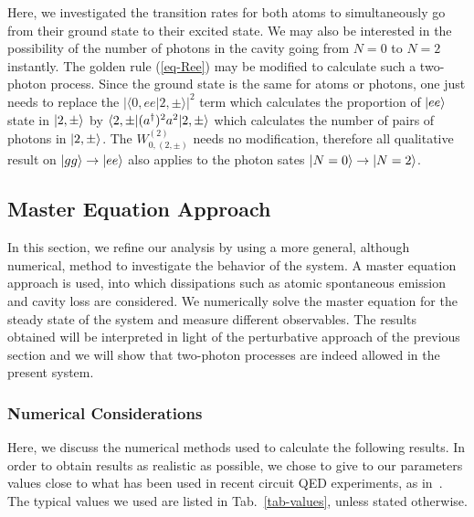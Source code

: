 Here, we investigated the transition rates for both atoms to simultaneously go from their ground state to their excited state. We may also be interested in the possibility of the number of photons in the cavity going from $N=0$ to $N=2$ instantly. The golden rule (\ref{eq-Ree}) may be modified to calculate such a two-photon process. Since the ground state is the same for atoms or photons, one just needs to replace the $|\langle 0,ee | 2,\pm \rangle|^2$ term which calculates the proportion of $| ee \rangle$ state in $| 2,\pm \rangle$ by $\langle 2,\pm | (a^\dagger)^2 a^2 | 2,\pm \rangle$ which calculates the number of pairs of photons in $| 2,\pm \rangle$. The $W^{(2)}_{0,(2,\pm)}$ needs no modification, therefore all qualitative result on $| gg \rangle\rightarrow | ee \rangle$ also applies to the  photon sates $| N=0 \rangle\rightarrow | N=2 \rangle$.

\subsection{Master Equation Approach} \label{sec-QEDdiss}

In this section, we refine our analysis by using a more general, although numerical, method to investigate the behavior of the system. A master equation approach is used, into which dissipations such as atomic spontaneous emission and cavity loss are considered. We numerically solve the master equation for the steady state of the system and measure different observables. The results obtained will be interpreted in light of the perturbative approach of the previous section and we will show that two-photon processes are indeed allowed in the present system.

\subsubsection{Numerical Considerations}

Here, we discuss the numerical methods used to calculate the following results. In order to obtain results as realistic as possible, we chose to give to our parameters values close to what has been used in recent circuit QED experiments, as in~\cite{Fin09}. The typical values we used are listed in Tab.~\ref{tab-values}, unless stated otherwise.

